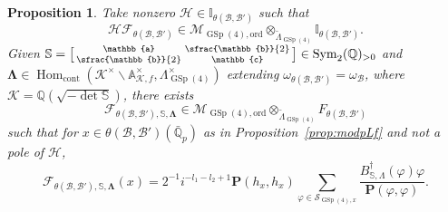 \documentclass[JEP,XML,SOM,Unicode,published]{cedram}
\newenvironment{smallbmatrix}{\big[\begin{smallmatrix}}{\end{smallmatrix}\big]}
\theoremstyle{plain}
\newtheorem{prop}[thm]{Proposition}
\theoremstyle{remark}
\newcommand{\bA}{\mathbb{A}}
\newcommand{\bI}{\mathbb{I}}
\newcommand{\bQ}{\mathbb{Q}}
\newcommand{\bS}{\mathbb{S}}
\newcommand{\bba}{\mathbb{a}}
\newcommand{\bbb}{\mathbb{b}}
\newcommand{\bbc}{\mathbb{c}}
\newcommand{\cF}{\mathcal{F}}
\newcommand{\cH}{\mathcal{H}}
\newcommand{\cK}{\mathcal{K}}
\newcommand{\cM}{\mathcal{M}}
\newcommand{\sB}{\mathscr{B}}
\newcommand{\sS}{\mathscr{S}}
\newcommand{\bfP}{\mathbf{P}}
\DeclareMathOperator{\GSp}{GSp}
\newcommand{\cont}{\mathrm{cont}}
\newcommand{\ord}{\mathrm{ord}}
\DeclareMathOperator{\Hom}{Hom}
\DeclareMathOperator{\Sym}{Sym}
\let\wt\widetilde
\let\bes B
\newcommand{\bLam}{\boldsymbol\Lambda}
\begin{document}
\begin{prop} \label{prop:intBes}
Take nonzero $\cH\in \bI_{\theta(\sB,\sB')}$ such that
\[
\cH \cF_{\theta(\sB,\sB')}\in \cM_{\GSp(4),\ord}\otimes_{\wt{\Lambda}_{\GSp(4)}} \bI_{\theta(\sB,\sB')}.
\]
Given $\bS=\begin{smallbmatrix}\bba&\sfrac{\bbb}{2}\\\sfrac{\bbb}{2}&\bbc\end{smallbmatrix}\in\Sym_2(\bQ)_{>0}$ and $\bLam\in\Hom_\cont(\cK^\times\backslash\bA^\times_{\cK,f},\Lambda^\times_{\GSp(4)})$ extending $\omega_{\theta(\sB,\sB')}=\omega_{\sB}$, where $\cK=\bQ(\sqrt{-\det\bS})$, there exists
\[
\cF_{\theta(\sB,\sB'),\bS,\bLam}
\in \cM_{\GSp(4),\ord}\otimes_{\wt{\Lambda}_{\GSp(4)}} F_{\theta(\sB,\sB')}
\]
such that for $x\in\theta(\sB,\sB')(\bar{\bQ}_p)$ as in Proposition~\ref{prop:modpLf} and not a pole of $\cH$,
\[
\cF_{\theta(\sB,\sB'),\bS,\bLam}(x)=2^{-1}i^{-l_1-l_2+1}\bfP(h_x,h_x)\sum_{\varphi\in\sS_{\GSp(4),x}} \frac{\bes^\dagger_{\bS,\Lambda}(\varphi)\varphi}{\bfP(\varphi,\varphi)}.
\]
\end{prop}
\end{document}
